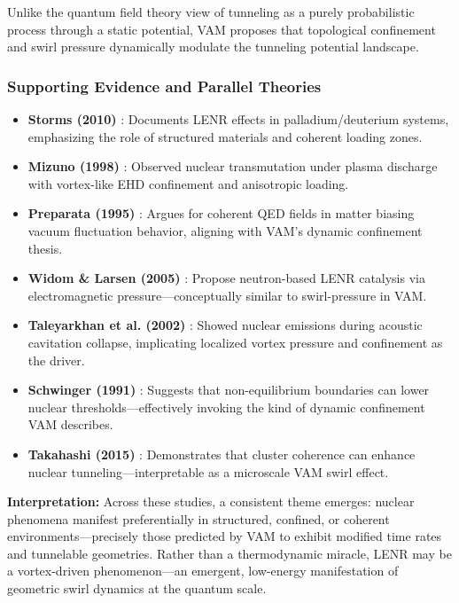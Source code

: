 \documentclass[a4paper, aps,preprint,superscriptaddress, 12pt]{revtex4}
\begin{document}
Unlike the quantum field theory view of tunneling as a purely probabilistic process through a static potential, VAM proposes that topological confinement and swirl pressure dynamically modulate the tunneling potential landscape.

\subsubsection{Supporting Evidence and Parallel Theories}

\begin{itemize}
    \item \textbf{Storms (2010)} \cite{storms2010}: Documents LENR effects in palladium/deuterium systems, emphasizing the role of structured materials and coherent loading zones.

    \item \textbf{Mizuno (1998)} \cite{mizuno1998}: Observed nuclear transmutation under plasma discharge with vortex-like EHD confinement and anisotropic loading.

    \item \textbf{Preparata (1995)} \cite{preparata1995}: Argues for coherent QED fields in matter biasing vacuum fluctuation behavior, aligning with VAM's dynamic confinement thesis.

    \item \textbf{Widom \& Larsen (2005)} \cite{widom2005}: Propose neutron-based LENR catalysis via electromagnetic pressure---conceptually similar to swirl-pressure in VAM.

    \item \textbf{Taleyarkhan et al. (2002)} \cite{taleyarkhan2002}: Showed nuclear emissions during acoustic cavitation collapse, implicating localized vortex pressure and confinement as the driver.

    \item \textbf{Schwinger (1991)} \cite{schwinger1991}: Suggests that non-equilibrium boundaries can lower nuclear thresholds---effectively invoking the kind of dynamic confinement VAM describes.

    \item \textbf{Takahashi (2015)} \cite{takahashi2015}: Demonstrates that cluster coherence can enhance nuclear tunneling---interpretable as a microscale VAM swirl effect.
\end{itemize}

\textbf{Interpretation:} Across these studies, a consistent theme emerges: nuclear phenomena manifest preferentially in structured, confined, or coherent environments---precisely those predicted by VAM to exhibit modified time rates and tunnelable geometries. Rather than a thermodynamic miracle, LENR may be a vortex-driven phenomenon—an emergent, low-energy manifestation of geometric swirl dynamics at the quantum scale.
\end{document}
